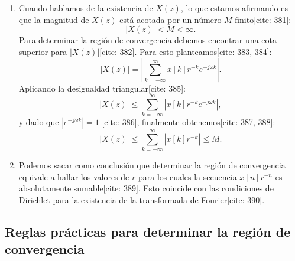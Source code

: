 \documentclass[11pt,a4paper,openany]{book}
\begin{document}
\begin{enumerate}
	\item Cuando hablamos de la existencia de $X(z)$, lo que estamos afirmando es que la magnitud de $X(z)$ est\'{a} acotada por un n\'{u}mero $M$ finito[cite: 381]:
	\begin{equation}
		|X(z)| < M < \infty.
	\end{equation}
	Para determinar la regi\'{o}n de convergencia debemos encontrar una cota superior para $|X(z)|$[cite: 382]. Para esto planteamos[cite: 383, 384]:
	\begin{equation}
		|X(z)| = \left| \sum_{k=-\infty}^{\infty} x[k] r^{-k} e^{-j \omega k} \right|.
	\end{equation}
	Aplicando la desigualdad triangular[cite: 385]:
	\begin{equation}
		|X(z)| \leq \sum_{k=-\infty}^{\infty} \left| x[k] r^{-k} e^{-j \omega k} \right|,
	\end{equation}
	y dado que $|e^{-j \omega k}| = 1$ [cite: 386], finalmente obtenemos[cite: 387, 388]:
	\begin{equation}
		|X(z)| \leq \sum_{k=-\infty}^{\infty} \left| x[k] r^{-k} \right| \leq M.
	\end{equation}
	
	\item Podemos sacar como conclusi\'{o}n que determinar la regi\'{o}n de convergencia equivale a hallar los valores de $r$ para los cuales la secuencia $x[n] r^{-n}$ es absolutamente sumable[cite: 389]. Esto coincide con las condiciones de Dirichlet para la existencia de la transformada de Fourier[cite: 390].
\end{enumerate}


\subsection{Reglas pr\'{a}cticas para determinar la regi\'{o}n de convergencia}
\end{document}
